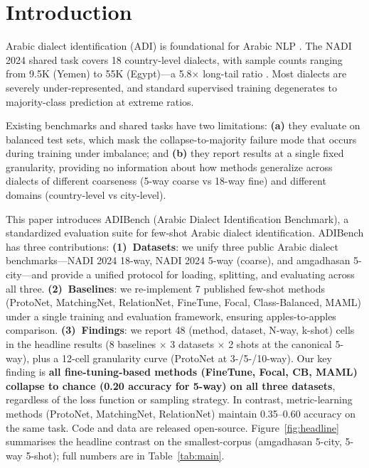 \documentclass[11pt]{article}
\newcommand{\bench}{ADIBench}
\begin{document}
\section{Introduction}
Arabic dialect identification (ADI) is foundational for Arabic
NLP \citep{Al-Badrashiny2024,Bouamor2019}. The NADI 2024 shared
task covers 18 country-level dialects, with sample counts
ranging from 9.5K (Yemen) to 55K (Egypt)---a 5.8$\times$
long-tail ratio \citep{Al-Badrashiny2024}. Most dialects are
severely under-represented, and standard supervised training
degenerates to majority-class prediction at extreme ratios.

Existing benchmarks and shared tasks have two limitations:
\textbf{(a)} they evaluate on balanced test sets, which mask the
collapse-to-majority failure mode that occurs during training
under imbalance; and \textbf{(b)} they report results at a
single fixed granularity, providing no information about how
methods generalize across dialects of different coarseness
(5-way coarse vs 18-way fine) and different domains (country-level
vs city-level).

This paper introduces \bench{} (Arabic Dialect Identification
Benchmark), a standardized evaluation suite for few-shot Arabic
dialect identification. \bench{} has three contributions:
\textbf{(1)~Datasets}: we unify three public Arabic dialect
benchmarks---NADI 2024 18-way, NADI 2024 5-way (coarse), and
amgadhasan 5-city---and provide a unified protocol for loading,
splitting, and evaluating across all three.
\textbf{(2)~Baselines}: we re-implement 7 published few-shot
methods (ProtoNet, MatchingNet, RelationNet, FineTune, Focal,
Class-Balanced, MAML) under a single training and evaluation
framework, ensuring apples-to-apples comparison.
\textbf{(3)~Findings}: we report 48 (method, dataset, N-way,
k-shot) cells in the headline results (8 baselines
$\times$ 3 datasets $\times$ 2 shots at the canonical 5-way),
plus a 12-cell granularity curve (ProtoNet at 3-/5-/10-way).
Our key finding is \textbf{all fine-tuning-based methods
(FineTune, Focal, CB, MAML) collapse to chance (0.20 accuracy
for 5-way) on all three datasets}, regardless of the loss
function or sampling strategy. In contrast, metric-learning
methods (ProtoNet, MatchingNet, RelationNet) maintain
0.35--0.60 accuracy on the same task. Code and data are
released open-source. Figure~\ref{fig:headline} summarises the
headline contrast on the smallest-corpus (amgadhasan 5-city,
5-way 5-shot); full numbers are in
Table~\ref{tab:main}.
\end{document}
